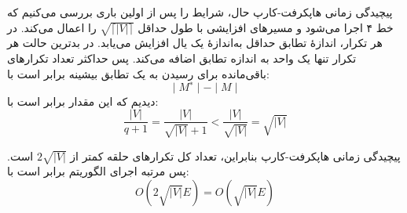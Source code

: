 \begin{itemframe}{‌پیچیدگی زمانی هاپکرفت-کارپ}
\itm
حال، شرایط را پس از اولین باری بررسی می‌کنیم که خط ۴ اجرا می‌شود و مسیرهای افزایشی با طول حداقل
$\sqrt{\lceil |V| \rceil}$
 را اعمال می‌کند.
\itm
در هر تکرار، اندازهٔ تطابق حداقل به‌اندازهٔ یک یال افزایش می‌یابد. در بدترین حالت هر تکرار تنها یک واحد به اندازه تطابق اضافه می‌کند. پس حداکثر تعداد تکرارهای باقی‌مانده برای رسیدن به یک تطابق بیشینه برابر است با:
$$
∣M^∗∣−∣M∣
$$
\itm
دیدیم که این مقدار برابر است با:
$$
\frac{ |V|}{q + 1} = \frac{|V|}{\sqrt{|V|} + 1} < \frac{|V|}{\sqrt{|V|}} = \sqrt{|V|}
$$

\end{itemframe}

\begin{itemframe}{‌پیچیدگی زمانی هاپکرفت-کارپ}
\itm
بنابراین، تعداد کل تکرارهای حلقه کمتر از $2\sqrt{|V|}$ است. پس مرتبه اجرای الگوریتم برابر است با:
$$
O(2\sqrt{|V|} E) = O(\sqrt{|V|} E)
$$
\end{itemframe}
\iffalse
\fi

